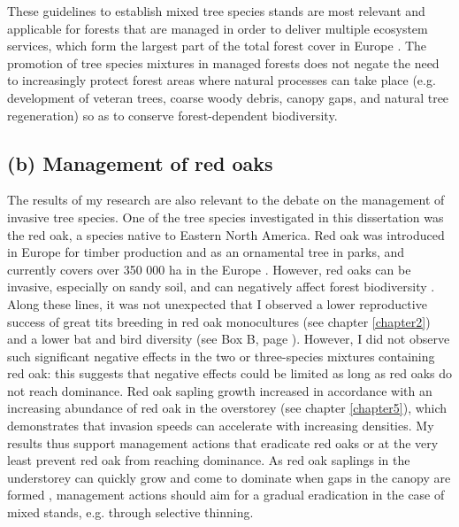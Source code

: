 \documentclass[10pt, twoside]{book} %
\begin{document}
	These guidelines to establish mixed tree species stands are most relevant and applicable for forests that are managed in order to deliver multiple ecosystem services, which form the largest part of the total forest cover in Europe \citep{Brockerhoff2017, Sabatini2018}. The promotion of tree species mixtures in managed forests does not negate the need to increasingly protect forest areas where natural processes can take place (e.g. development of veteran trees, coarse woody debris, canopy gaps, and natural tree regeneration) so as to conserve forest-dependent biodiversity.\\
	
	
	\subsection*{(b) Management of red oaks}
	The results of my research are also relevant to the debate on the management of invasive tree species. One of the tree species investigated in this dissertation was the red oak, a species native to Eastern North America. Red oak was introduced in Europe for timber production and as an ornamental tree in parks, and currently covers over 350 000 ha in the Europe \citep{Nicolescu2020}. However, red oaks can be invasive, especially on sandy soil, and can negatively affect forest biodiversity \citep{Goßner2004, Campagnaro2018, Chmura2013, VanSchrojensteinLantman2020}. Along these lines, it was not unexpected that I observed a lower reproductive success of great tits breeding in red oak monocultures (see chapter \ref{chapter2}) and a lower bat and bird diversity (see Box B, page \pageref{boxb}). However, I did not observe such significant negative effects in the two or three-species mixtures containing red oak: this suggests that negative effects could be limited as long as red oaks do not reach dominance. Red oak sapling growth increased in accordance with an increasing abundance of red oak in the overstorey (see chapter \ref{chapter5}), which demonstrates that invasion speeds can accelerate with increasing densities. My results thus support management actions that eradicate red oaks or at the very least prevent red oak from reaching dominance. As red oak saplings in the understorey can quickly grow and come to dominate when gaps in the canopy are formed \citep{Dey1996}, management actions should aim for a gradual eradication in the case of mixed stands, e.g. through selective thinning.\\ 
	
\end{document}
